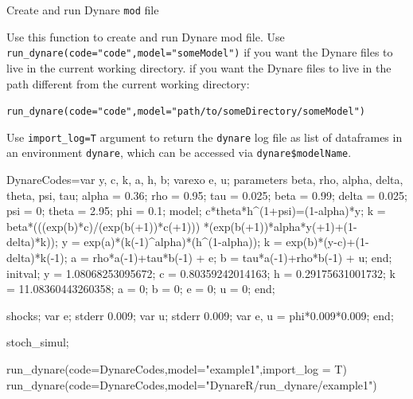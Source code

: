 \documentclass[
  12pt,
  legalpaperpaper,
  DIV=11,
  numbers=noendperiod]{scrartcl}
\newenvironment{Shaded}{\begin{snugshade}}{\end{snugshade}}
\newcommand{\AttributeTok}[1]{\textcolor[rgb]{0.40,0.45,0.13}{#1}}
\newcommand{\FunctionTok}[1]{\textcolor[rgb]{0.28,0.35,0.67}{#1}}
\newcommand{\NormalTok}[1]{\textcolor[rgb]{0.00,0.23,0.31}{#1}}
\newcommand{\OtherTok}[1]{\textcolor[rgb]{0.00,0.23,0.31}{#1}}
\newcommand{\StringTok}[1]{\textcolor[rgb]{0.13,0.47,0.30}{#1}}
\begin{document}
Create and run Dynare \texttt{mod} file

Use this function to create and run Dynare mod file. Use
\texttt{run\_dynare(code="code",model="someModel")} if you want the
Dynare files to live in the current working directory. if you want the
Dynare files to live in the path different from the current working
directory:

\texttt{run\_dynare(code="code",model="path/to/someDirectory/someModel")}

Use \texttt{import\_log=T} argument to return the \texttt{dynare} log
file as list of dataframes in an environment \texttt{dynare}, which can
be accessed via \texttt{dynare\$modelName}.

\begin{Shaded}
\begin{Highlighting}[]
\NormalTok{DynareCodes}\OtherTok{=}\StringTok{\textquotesingle{}var y, c, k, a, h, b;}
\StringTok{varexo e, u;}
\StringTok{parameters beta, rho, alpha, delta, theta, psi, tau;}
\StringTok{alpha = 0.36;}
\StringTok{rho   = 0.95;}
\StringTok{tau   = 0.025;}
\StringTok{beta  = 0.99;}
\StringTok{delta = 0.025;}
\StringTok{psi   = 0;}
\StringTok{theta = 2.95;}
\StringTok{phi   = 0.1;}
\StringTok{model;}
\StringTok{c*theta*h\^{}(1+psi)=(1{-}alpha)*y;}
\StringTok{k = beta*(((exp(b)*c)/(exp(b(+1))*c(+1)))}
\StringTok{          *(exp(b(+1))*alpha*y(+1)+(1{-}delta)*k));}
\StringTok{y = exp(a)*(k({-}1)\^{}alpha)*(h\^{}(1{-}alpha));}
\StringTok{k = exp(b)*(y{-}c)+(1{-}delta)*k({-}1);}
\StringTok{a = rho*a({-}1)+tau*b({-}1) + e;}
\StringTok{b = tau*a({-}1)+rho*b({-}1) + u;}
\StringTok{end;}
\StringTok{initval;}
\StringTok{y = 1.08068253095672;}
\StringTok{c = 0.80359242014163;}
\StringTok{h = 0.29175631001732;}
\StringTok{k = 11.08360443260358;}
\StringTok{a = 0;}
\StringTok{b = 0;}
\StringTok{e = 0;}
\StringTok{u = 0;}
\StringTok{end;}

\StringTok{shocks;}
\StringTok{var e; stderr 0.009;}
\StringTok{var u; stderr 0.009;}
\StringTok{var e, u = phi*0.009*0.009;}
\StringTok{end;}

\StringTok{stoch\_simul;\textquotesingle{}}

\FunctionTok{run\_dynare}\NormalTok{(}\AttributeTok{code=}\NormalTok{DynareCodes,}\AttributeTok{model=}\StringTok{"example1"}\NormalTok{,}\AttributeTok{import\_log =}\NormalTok{ T)}
\FunctionTok{run\_dynare}\NormalTok{(}\AttributeTok{code=}\NormalTok{DynareCodes,}\AttributeTok{model=}\StringTok{"DynareR/run\_dynare/example1"}\NormalTok{)}
\end{Highlighting}
\end{Shaded}
\end{document}
